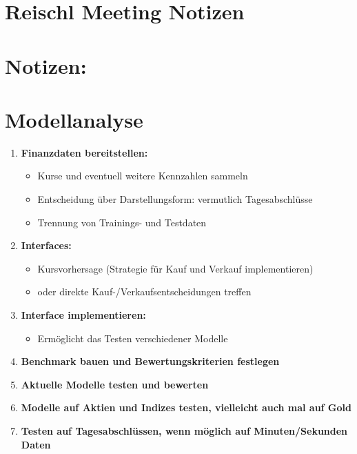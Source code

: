 \section*{Reischl Meeting Notizen}


\newpage

\section*{Notizen:}

\section*{Modellanalyse}

\begin{enumerate}
    \item \textbf{Finanzdaten bereitstellen:}
          \begin{itemize}
              \item Kurse und eventuell weitere Kennzahlen sammeln
              \item Entscheidung über Darstellungsform: vermutlich Tagesabschlüsse
              \item Trennung von Trainings- und Testdaten
          \end{itemize}

    \item \textbf{Interfaces:}
          \begin{itemize}
              \item Kursvorhersage (Strategie für Kauf und Verkauf implementieren)
              \item oder direkte Kauf-/Verkaufsentscheidungen treffen
          \end{itemize}

    \item \textbf{Interface implementieren:}
          \begin{itemize}
              \item Ermöglicht das Testen verschiedener Modelle
          \end{itemize}
    \item \textbf{Benchmark bauen und Bewertungskriterien festlegen}
    \item \textbf{Aktuelle Modelle testen und bewerten}
    \item \textbf{Modelle auf Aktien und Indizes testen, vielleicht auch mal auf Gold}
    \item \textbf{Testen auf Tagesabschlüssen, wenn möglich auf Minuten/Sekunden Daten}
\end{enumerate}

